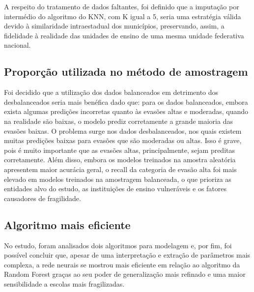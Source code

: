 \par A respeito do tratamento de dados faltantes, foi definido que a imputação por intermédio do algoritmo do KNN, com K igual a 5, seria uma estratégia válida devido à similaridade intraestadual dos municípios, preservando, assim, a fidelidade à realidade das unidades de ensino de uma mesma unidade federativa nacional.

\subsection{Proporção utilizada no método de amostragem}

\par Foi decidido que a utilização dos dados balanceados em detrimento dos desbalanceados seria mais benéfica dado que: para os dados balanceados, embora exista algumas predições incorretas quanto às evasões altas e moderadas, quando na realidade são baixas, o modelo prediz corretamente a grande maioria das evasões baixas. O problema surge nos dados desbalanceados, nos quais existem muitas predições baixas para evasões que são moderadas ou altas. Isso é grave, pois é muito importante que as evasões altas, principalmente, sejam preditas corretamente. Além disso, embora os modelos treinados na amostra aleatória apresentem maior acurácia geral, o recall da categoria de evasão alta foi mais elevado em modelos treinados na amostragem balanceada, o que prioriza as entidades alvo do estudo, as instituições de ensino vulneráveis e os fatores causadores de fragilidade.

\subsection{Algoritmo mais eficiente}

\par No estudo, foram analisados dois algoritmos para modelagem e, por fim, foi possível concluir que, apesar de uma interpretação e extração de parâmetros mais complexa, a rede neurais se mostrou mais eficiente em relação ao algoritmo da Random Forest graças ao seu poder de generalização mais refinado e uma maior sensibilidade a escolas mais fragilizadas.